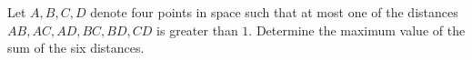 Let $A,B,C,D$ denote four points in space such that at most one of the distances $AB,AC,AD,BC,BD,CD$ is greater than $1$. Determine the maximum value of the sum of the six distances.